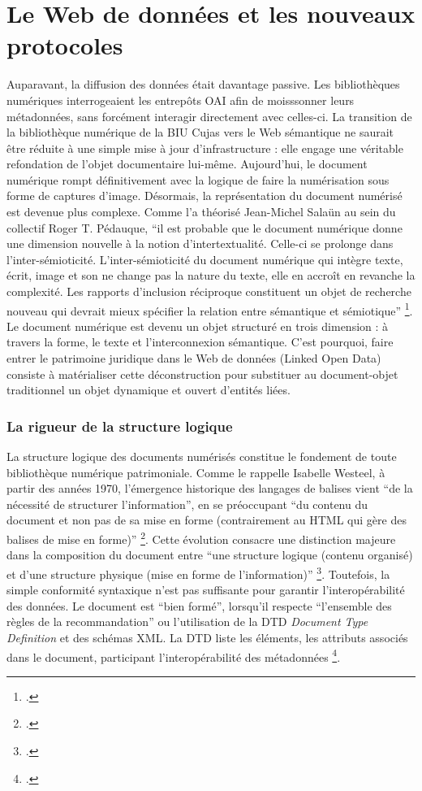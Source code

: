 \section{Le Web de données et les nouveaux protocoles}
Auparavant, la diffusion des données était davantage passive. Les bibliothèques numériques interrogeaient les entrepôts OAI afin de moisssonner leurs métadonnées, sans forcément interagir directement avec celles-ci. La transition de la bibliothèque numérique de la \ac{BIU Cujas} vers le Web sémantique ne saurait être réduite à une simple mise à jour d'infrastructure : elle engage une véritable refondation de l'objet documentaire lui-même. Aujourd'hui, le document numérique rompt définitivement avec la logique de faire la numérisation sous forme de captures d'image. Désormais, la représentation du document numérisé est devenue plus complexe. Comme l'a théorisé Jean-Michel Salaün au sein du collectif Roger T. Pédauque, \enquote{il est probable que le document numérique donne une dimension nouvelle à la notion d’intertextualité. Celle-ci se prolonge dans l’inter-sémioticité. L’inter-sémioticité du document numérique qui intègre texte, écrit, image et son ne change pas la nature du texte, elle en accroît en revanche la complexité. Les rapports d’inclusion réciproque constituent un objet de recherche nouveau qui devrait mieux spécifier la relation entre sémantique et sémiotique} \footcite{pedauqueDocumentLumiereNumerique2006}. Le document numérique est devenu un objet structuré en trois dimension : à travers la forme, le texte et l'interconnexion sémantique. C'est pourquoi, faire entrer le patrimoine juridique dans le Web de données (Linked Open Data) consiste à matérialiser cette déconstruction pour substituer au document-objet traditionnel un objet dynamique et ouvert d'entités liées.

\subsubsection{La rigueur de la structure logique}
La structure logique des documents numérisés constitue le fondement de toute bibliothèque numérique patrimoniale. Comme le rappelle Isabelle Westeel, à partir des années 1970, l'émergence historique des langages de balises vient \enquote{de la nécessité de structurer l'information}, en se préoccupant \enquote{du contenu du document et non pas de sa mise en forme (contrairement au \ac{HTML} qui gère des balises de mise en forme)} \footcite{westeelIndexerStructurerEchanger2010}. Cette évolution consacre une distinction majeure dans la composition du document entre \enquote{une structure logique (contenu organisé) et d'une structure physique (mise en forme de l'information)} \footcite{westeelIndexerStructurerEchanger2010}. Toutefois, la simple conformité syntaxique n'est pas suffisante pour garantir l'interopérabilité des données. Le document est \enquote{bien formé}, lorsqu'il respecte \enquote{l'ensemble des règles de la recommandation} ou l'utilisation de la DTD \textit{Document Type Definition} et des schémas \ac{XML}. La DTD liste les éléments, les attributs associés dans le document, participant l'interopérabilité des métadonnées \footcite{westeelIndexerStructurerEchanger2010}.

